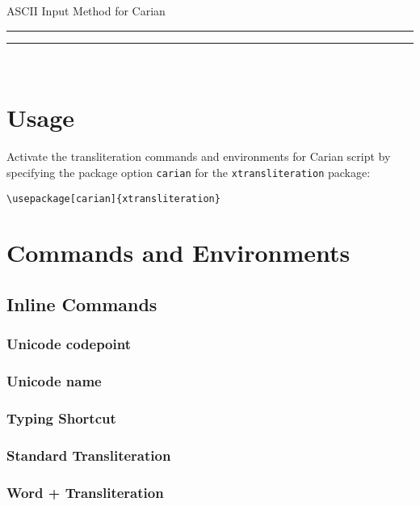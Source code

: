 \documentclass{article}
\newcommand\bqq[1]{\begin{quotation}#1\end{quotation}}
\begin{document}
\begin{center}
{\ttfamily ASCII Input Method for Carian}

\rule{0.4\textwidth}{0.2pt}
\end{center}

\tableofcontents

\bigskip
\hfill\rule{0.4\textwidth}{0.2pt}\hfill\ 

\section{Usage}
Activate the transliteration commands and environments for Carian script by specifying the package option \texttt{carian} for the \texttt{xtransliteration} package:

\begin{center}
\verb|\usepackage[carian]{xtransliteration}|
\end{center}

\section{Commands and Environments}

\subsection{Inline Commands}
\subsubsection{Unicode codepoint}
\bqq{}

\subsubsection{Unicode name}
\bqq{}

\subsubsection{Typing Shortcut}
\bqq{}

\subsubsection{Standard Transliteration}
\bqq{}

\subsubsection{Word + Transliteration}
\bqq{}
\end{document}
